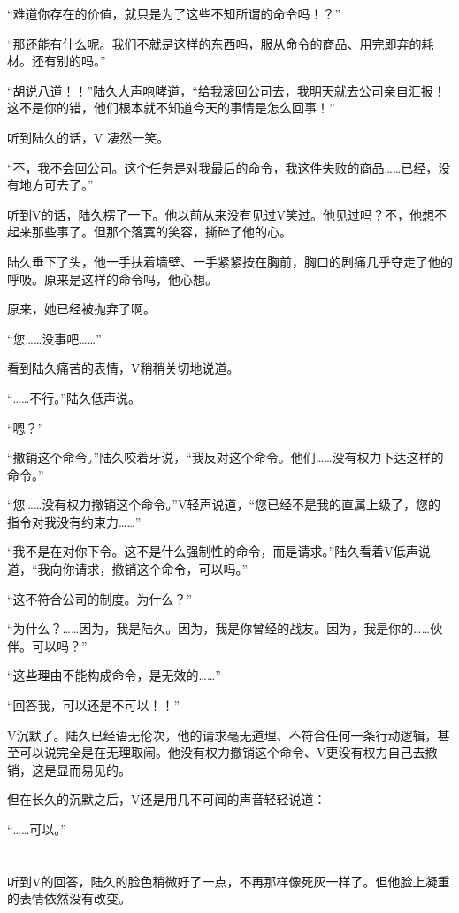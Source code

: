 “难道你存在的价值，就只是为了这些不知所谓的命令吗！？”

“那还能有什么呢。我们不就是这样的东西吗，服从命令的商品、用完即弃的耗材。还有别的吗。”

“胡说八道！！”陆久大声咆哮道，“给我滚回公司去，我明天就去公司亲自汇报！这不是你的错，他们根本就不知道今天的事情是怎么回事！”

听到陆久的话，V 凄然一笑。

“不，我不会回公司。这个任务是对我最后的命令，我这件失败的商品……已经，没有地方可去了。”

听到V的话，陆久楞了一下。他以前从来没有见过V笑过。他见过吗？不，他想不起来那些事了。但那个落寞的笑容，撕碎了他的心。

陆久垂下了头，他一手扶着墙壁、一手紧紧按在胸前，胸口的剧痛几乎夺走了他的呼吸。原来是这样的命令吗，他心想。

原来，她已经被抛弃了啊。

“您……没事吧……”

看到陆久痛苦的表情，V稍稍关切地说道。

“……不行。”陆久低声说。

“嗯？”

“撤销这个命令。”陆久咬着牙说，“我反对这个命令。他们……没有权力下达这样的命令。”

“您……没有权力撤销这个命令。”V轻声说道，“您已经不是我的直属上级了，您的指令对我没有约束力……”

“我不是在对你下令。这不是什么强制性的命令，而是请求。”陆久看着V低声说道，“我向你请求，撤销这个命令，可以吗。”

“这不符合公司的制度。为什么？”

“为什么？……因为，我是陆久。因为，我是你曾经的战友。因为，我是你的……伙伴。可以吗？”

“这些理由不能构成命令，是无效的……”

“回答我，可以还是不可以！！”

V沉默了。陆久已经语无伦次，他的请求毫无道理、不符合任何一条行动逻辑，甚至可以说完全是在无理取闹。他没有权力撤销这个命令、V更没有权力自己去撤销，这是显而易见的。

但在长久的沉默之后，V还是用几不可闻的声音轻轻说道：

“……可以。”

\section*{}

听到V的回答，陆久的脸色稍微好了一点，不再那样像死灰一样了。但他脸上凝重的表情依然没有改变。


